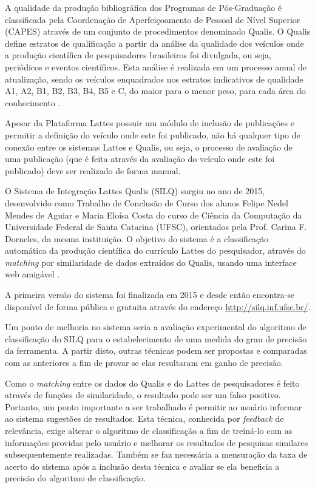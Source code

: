 \documentclass[12pt]{article}
\begin{document}
A qualidade da produção bibliográfica dos Programas de Pós-Graduação é classificada pela Coordenação de Aperfeiçoamento de Pessoal de Nível Superior (CAPES) através de um conjunto de procedimentos denominado Qualis. O Qualis define estratos de qualificação a partir da análise da qualidade dos veículos onde a produção científica de pesquisadores brasileiros foi divulgada, ou seja, periódicos e eventos científicos. Esta análise é realizada em um processo anual de atualização, sendo os veículos enquadrados nos estratos indicativos de qualidade A1, A2, B1, B2, B3, B4, B5 e C, do maior para o menor peso, para cada área do conhecimento \cite{CAPES-Classificacao}.

Apesar da Plataforma Lattes possuir um módulo de inclusão de publicações e permitir a definição do veículo onde este foi publicado, não há qualquer tipo de conexão entre os sistemas Lattes e Qualis, ou seja, o processo de avaliação de uma publicação (que é feita através da avaliação do veículo onde este foi publicado) deve ser realizado de forma manual.

O Sistema de Integração Lattes Qualis (SILQ) surgiu no ano de 2015, desenvolvido como Trabalho de Conclusão de Curso dos alunos Felipe Nedel Mendes de Aguiar e Maria Eloísa Costa do curso de Ciência da Computação da Universidade Federal de Santa Catarina (UFSC), orientados pela Prof. Carina F. Dorneles, da mesma instituição. O objetivo do sistema é a classificação automática da produção científica do currículo Lattes do pesquisador, através do \textit{matching} por similaridade de dados extraídos do Qualis, usando uma interface web amigável \cite{Silq1}.

A primeira versão do sistema foi finalizada em 2015 e desde então encontra-se disponível de forma pública e gratuita através do endereço \url{http://silq.inf.ufsc.br/}.

Um ponto de melhoria no sistema seria a avaliação experimental do algoritmo de classificação do SILQ para o estabelecimento de uma medida do grau de precisão da ferramenta. A partir disto, outras técnicas podem ser propostas e comparadas com as anteriores a fim de provar se elas resultaram em ganho de precisão.

Como o \textit{matching} entre os dados do Qualis e do Lattes de pesquisadores é feito através de funções de similaridade, o resultado pode ser um falso positivo. Portanto, um ponto importante a ser trabalhado é permitir ao usuário informar ao sistema sugestões de resultados. Esta técnica, conhecida por \textit{feedback} de relevância, exige alterar o algoritmo de classificação a fim de treiná-lo com as informações providas pelo usuário e melhorar os resultados de pesquisas similares subsequentemente realizadas. Também se faz necessária a mensuração da taxa de acerto do sistema após a inclusão desta técnica e avaliar se ela beneficia a precisão do algoritmo de classificação.
\end{document}
